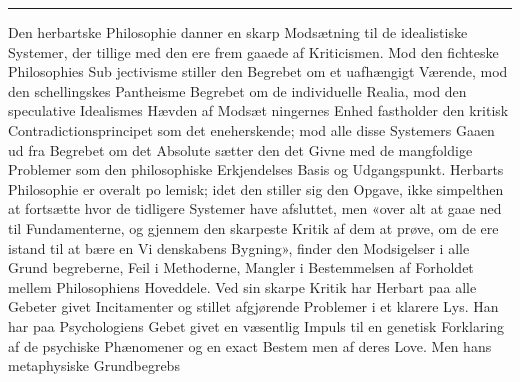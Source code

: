 \documentclass[12pt,a4paper]{book}
\newcommand{\divrule}{\begin{center}\rule{2cm}{0.4pt}\end{center}}
\begin{document}
\divrule

Den herbartske Philosophie danner en skarp Modsætning
til de idealistiske Systemer, der tillige med den ere frem\-%
gaaede af Kriticismen. Mod den fichteske Philosophies Sub\-%
jectivisme stiller den Begrebet om et uafhængigt Værende,
mod den schellingskes Pantheisme Begrebet om de individuelle
Realia, mod den speculative Idealismes Hævden af Modsæt\-%
ningernes Enhed fastholder den kritisk Contradictionsprincipet
som det eneherskende; mod alle disse Systemers Gaaen ud fra
Begrebet om det Absolute sætter den det Givne med de
mangfoldige Problemer som den philosophiske Erkjendelses
Basis og Udgangspunkt. Herbarts Philosophie er overalt po\-%
lemisk; idet den stiller sig den Opgave, ikke simpelthen at
fortsætte hvor de tidligere Systemer have afsluttet, men «over\-%
alt at gaae ned til Fundamenterne, og gjennem den skarpeste
Kritik af dem at prøve, om de ere istand til at bære en Vi\-%
denskabens Bygning», finder den Modsigelser i alle Grund\-%
begreberne, Feil i Methoderne, Mangler i Bestemmelsen af
Forholdet mellem Philosophiens Hoveddele. Ved sin skarpe
Kritik har Herbart paa alle Gebeter givet Incitamenter og
stillet afgjørende Problemer i et klarere Lys. Han har paa
Psychologiens Gebet givet en væsentlig Impuls til en genetisk
Forklaring af de psychiske Phænomener og en exact Bestem\-%
men af deres Love. Men hans metaphysiske Grundbegrebs
\end{document}
